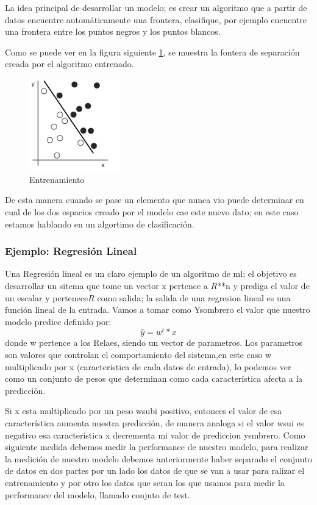 La idea principal de desarrollar un modelo; es crear un algoritmo que a partir de datos encuentre automáticamente una frontera, clasifique, por ejemplo encuentre una frontera entre los puntos negros y los puntos blancos.

Como se puede ver en la figura siguiente \ref{Fig:ejemplo-2}, se muestra la fontera de separación creada por el algoritmo entrenado.
\begin{figure}[H] \centering
  \includegraphics[height=4cm,keepaspectratio=true,clip=true]{imagenes/MarcoTeorico/sample-fit-1.png}
  \caption{Entrenamiento}\label{Fig:ejemplo-2}
\end{figure}

De esta manera cuando se pase un elemento que nunca vio puede determinar en cual de los dos espacios creado por el modelo cae este nuevo dato; en este caso estamos hablando en un algortimo de clasificación.

\subsubsection*{Ejemplo: Regresión Lineal}
Una Regresión lineal es un claro ejemplo de un algoritmo de \ac{ml}; el objetivo es desarrollar un sitema que tome un vector x pertence a $R$**n y prediga el valor de un escalar y pertenece$R$ como salida; la salida de una regresion lineal es una función lineal de la entrada.  Vamos a tomar como Ysombrero el valor que nuestro modelo predice definido por:
\begin{equation}
\hat{y} = w^t * x
\end{equation}
donde w pertence a los Relaes, siendo un vector de parametros.
Los parametros son valores que controlan el comportamiento del sistema,en este caso w  multiplicado por x (caracteristica de cada datos de entrada), lo podemos ver como un conjunto de pesos que determinan como cada característica afecta a la predicción.

Si x esta multiplicado por un peso wsubi positivo, entonces el valor de esa característica aumenta nuestra predicción, de manera analoga si el valor wsui es negativo esa característica x decrementa mi valor de prediccion ysmbrero.
Como siguiente medida debemos medir la performance de nuestro modelo, para realizar la medición de nuestro modelo debemos anteriormente haber separado el conjunto de datos en dos partes por un lado los datos de que se van a usar para ralizar el entrenamiento y por otro los datos que seran los que usamos para medir la performance del modelo, llamado conjuto de test.

